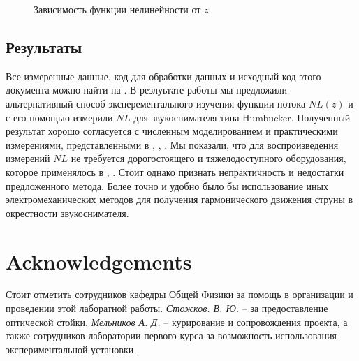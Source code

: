 \documentclass{article}
\begin{document}
\begin{figure}
    \centering
    
    \caption{Зависимость функции нелинейности от $z$}
    \label{fig:nl_static_z}
\end{figure}

\subsection{Результаты}

Все измеренные данные, код для обработки данных и исходный код этого документа можно найти на \cite{pickup-lab-repo}. 
В резлуьтате работы мы предложили альтернативный способ эксперементального изучения функции потока $NL(z)$
и с его помощью измерили $NL$ для звукоснимателя типа Humbucker. Полученный результат хорошо согласуется с
численным моделированием и практическими измерениями, представленными в \cite{acoustics-modeling-of-a-pickup}, 
\cite{novak:hal-02512148}, \cite{app7010050}. Мы показали, что для воспроизведения измерений $NL$ не требуется
дорогостоящего и тяжелодоступного оборудования, которое применялось в \cite{novak:hal-02512148}, \cite{app7010050}.
Стоит однако признать непрактичность и недостатки предложенного метода. Более точно и удобно было бы использование
иных электромеханических методов для получения гармонического движения струны в окрестности звукоснимателя.

\section{Acknowledgements}

Стоит отметить сотрудников кафедры Общей Физики за помощь в организации и проведении этой лаборатной работы.
\textit{Стожков. В. Ю.} -- за предоставление оптической стойки. \textit{Мельников А. Д.} -- курирование и сопровождения проекта, а
также сотрудников лаборатории первого курса за возможность использования экспериментальной установки \cite{string-lab}.

\printbibliography
\end{document}
